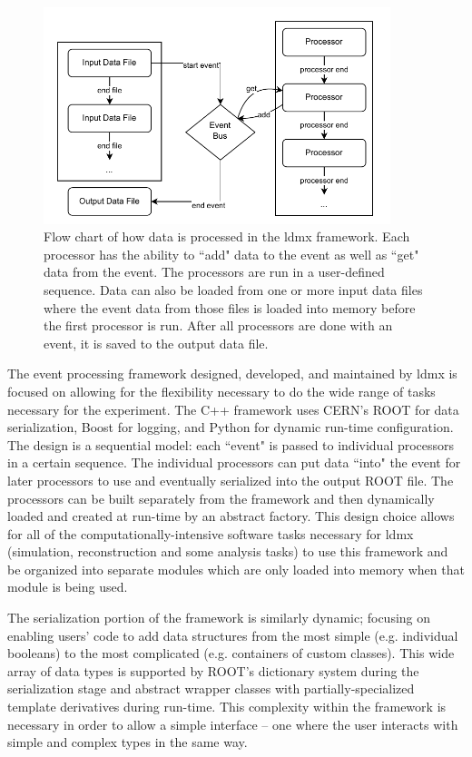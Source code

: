 \begin{figure}
    \centering
    \includegraphics[width=0.9\textwidth]{figures/ldmx/simulation/FrameworkFlowChart.drawio.pdf}
    \caption{Flow chart of how data is processed in the \ac{ldmx} framework. Each processor has the ability to ``add" data to the event as well as ``get" data from the event. The processors are run in a user-defined sequence. Data can also be loaded from one or more input data files where the event data from those files is loaded into memory before the first processor is run. After all processors are done with an event, it is saved to the output data file.}
    \label{fig:ldmx:sim:data-flow}
\end{figure}

The event processing framework designed, developed, and maintained by \ac{ldmx} is focused on allowing for the flexibility necessary to do the wide range of tasks necessary for the experiment. The C++ framework uses CERN's ROOT \cite{cernroot} for data serialization, Boost  for logging, and Python \cite{python} for dynamic run-time configuration. The design is a sequential model: each ``event" is passed to individual processors in a certain sequence. The individual processors can put data ``into" the event for later processors to use and eventually serialized into the output ROOT file. The processors can be built separately from the framework and then dynamically loaded and created at run-time by an abstract factory. This design choice allows for all of the computationally-intensive software tasks necessary for \ac{ldmx} (simulation, reconstruction and some analysis tasks) to use this framework and be organized into separate modules which are only loaded into memory when that module is being used.

The serialization portion of the framework is similarly dynamic; focusing on enabling users' code to add data structures from the most simple (e.g. individual booleans) to the most complicated (e.g. containers of custom classes). This wide array of data types is supported by ROOT's dictionary system during the serialization stage and abstract wrapper classes with partially-specialized template derivatives during run-time. This complexity within the framework is necessary in order to allow a simple interface -- one where the user interacts with simple and complex types in the same way.

